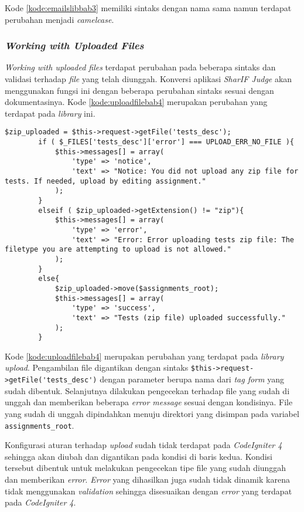Kode \ref{kode:emailslibbab3} memiliki sintaks dengan nama sama namun terdapat perubahan menjadi \textit{camelcase}.

\subsubsection{\textit{Working with Uploaded Files}}
\textit{Working with uploaded files} terdapat perubahan pada beberapa sintaks dan validasi terhadap \textit{file} yang telah diunggah. Konversi aplikasi \textit{SharIF Judge} akan menggunakan fungsi ini dengan beberapa perubahan sintaks sesuai dengan dokumentasinya. Kode \ref{kode:uploadfilebab4} merupakan perubahan yang terdapat pada \textit{library} ini. 
\begin{lstlisting}[caption=Perancangan perubahan \textit{library upload} pada \textit{CodeIgniter 4}, label=kode:uploadfilebab4]
$zip_uploaded = $this->request->getFile('tests_desc');
		if ( $_FILES['tests_desc']['error'] === UPLOAD_ERR_NO_FILE ){
			$this->messages[] = array(
				'type' => 'notice',
				'text' => "Notice: You did not upload any zip file for tests. If needed, upload by editing assignment."
			);
		}
		elseif ( $zip_uploaded->getExtension() != "zip"){
			$this->messages[] = array(
				'type' => 'error',
				'text' => "Error: Error uploading tests zip file: The filetype you are attempting to upload is not allowed."
			);
		}
		else{
			$zip_uploaded->move($assignments_root);
			$this->messages[] = array(
				'type' => 'success',
				'text' => "Tests (zip file) uploaded successfully."
			);
		}
\end{lstlisting}

Kode \ref{kode:uploadfilebab4} merupakan perubahan yang terdapat pada \textit{library upload}. Pengambilan file digantikan dengan sintaks \verb|$this->request->getFile('tests_desc')| dengan parameter berupa nama dari \textit{tag form} yang sudah dibentuk. Selanjutnya dilakukan pengecekan terhadap file yang sudah di unggah dan memberikan beberapa \textit{error message} sesuai dengan kondisinya. File yang sudah di unggah dipindahkan menuju direktori yang disimpan pada variabel \texttt{assignments\_root}. 

Konfigurasi aturan terhadap \textit{upload} sudah tidak terdapat pada \textit{CodeIgniter 4} sehingga akan diubah dan digantikan pada kondisi di baris kedua. Kondisi tersebut dibentuk untuk melakukan pengecekan tipe file yang sudah diunggah dan memberikan \textit{error}. \textit{Error} yang dihasilkan juga sudah tidak dinamik karena tidak menggunakan \textit{validation} sehingga disesuaikan dengan \textit{error} yang terdapat pada \textit{CodeIgniter 4}.


